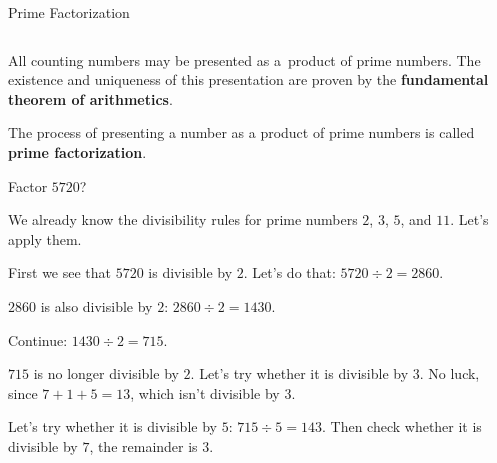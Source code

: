 \documentclass[9pt,aspectratio=169]{beamer}
\begin{document}
\begin{frame}{Prime Factorization}
  \begin{columns}[T]
    \begin{column}{0.5\textwidth}
      All counting numbers may be presented as a~product of prime numbers. The existence and uniqueness of this presentation are proven by the \textbf{fundamental theorem of arithmetics}.

      The process of presenting a number as a product of prime numbers is called \textbf{prime factorization}.
      \begin{problem}
        Factor $5720$?
      \end{problem}
      {\small
      We already know the divisibility rules for prime numbers $2$, $3$, $5$, and $11$. Let's apply them. 

      First we see that $5720$ is divisible by $2$. Let's do that:
      $5720 \div 2 = 2860$. 

      $2860$ is also divisible by $2$: $2860 \div 2 = 1430$. 

      Continue: $1430 \div 2 = 715$. 

      $715$ is no longer divisible by $2$. Let's try whether it is divisible by $3$. No luck, since $7+1+5=13$, which isn't divisible by $3$. 

      Let’s try whether it is divisible by $5$: $715 \div 5 = 143$. 
      Then check whether it is divisible by $7$, the remainder is $3$. 
      
}
\end{column}
\end{columns}
\end{frame}
\end{document}

